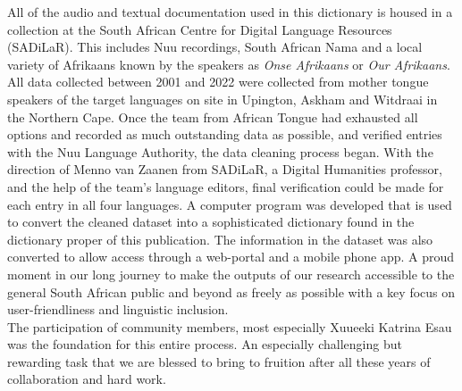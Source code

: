 All of the audio and textual documentation used in this dictionary is
housed in a collection at the South African Centre for Digital
Language Resources (SADiLaR). This includes N\textipa{\textvertline}uu
recordings, South African Nama and a local variety of Afrikaans known
by the speakers as \emph{Onse Afrikaans} or \emph{Our Afrikaans}. All
data collected between 2001 and 2022 were collected from mother tongue
speakers of the target languages on site in Upington, Askham and
Witdraai in the Northern Cape. Once the team from African Tongue had
exhausted all options and recorded as much outstanding data as
possible, and verified entries with the N\textipa{\textvertline}uu
Language Authority, the data cleaning process began. With the
direction of Menno van Zaanen from SADiLaR, a Digital Humanities
professor, and the help of the team's language editors, final
verification could be made for each entry in all four languages. A
computer program was developed that is used to convert the cleaned
dataset into a sophisticated dictionary found in the dictionary proper
of this publication. The information in the dataset was also converted
to allow access through a web-portal and a mobile phone app. A proud
moment in our long journey to make the outputs of our research
accessible to the general South African public and beyond as freely as
possible with a key focus on user-friendliness and linguistic
inclusion.\\

The participation of community members, most especially
\textipa{\textdoublebarpipe}Xuu\textipa{\textvertline}eeki Katrina
Esau was the foundation for this entire process. An especially
challenging but rewarding task that we are blessed to bring to
fruition after all these years of collaboration and hard work.\\

